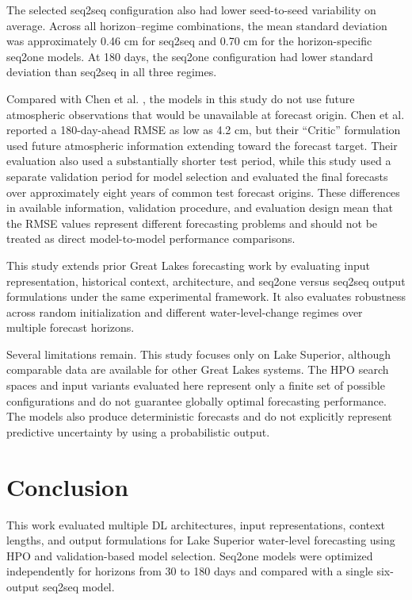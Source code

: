 \documentclass[conference]{IEEEtran}
\begin{document}
The selected seq2seq configuration also had lower seed-to-seed variability on average. Across all horizon--regime combinations, the mean standard deviation was approximately 0.46 cm for seq2seq and 0.70 cm for the horizon-specific seq2one models. At 180 days, the seq2one configuration had lower standard deviation than seq2seq in all three regimes.

Compared with Chen et al. \cite{chen2025dualtransformer}, the models in this study do not use future atmospheric observations that would be unavailable at forecast origin. Chen et al. reported a 180-day-ahead RMSE as low as 4.2 cm, but their ``Critic'' formulation used future atmospheric information extending toward the forecast target. Their evaluation also used a substantially shorter test period, while this study used a separate validation period for model selection and evaluated the final forecasts over approximately eight years of common test forecast origins. These differences in available information, validation procedure, and evaluation design mean that the RMSE values represent different forecasting problems and should not be treated as direct model-to-model performance comparisons.

This study extends prior Great Lakes forecasting work by evaluating input representation, historical context, architecture, and seq2one versus seq2seq output formulations under the same experimental framework. It also evaluates robustness across random initialization and different water-level-change regimes over multiple forecast horizons.

Several limitations remain. This study focuses only on Lake Superior, although comparable data are available for other Great Lakes systems. The HPO search spaces and input variants evaluated here represent only a finite set of possible configurations and do not guarantee globally optimal forecasting performance. The models also produce deterministic forecasts and do not explicitly represent predictive uncertainty by using a probabilistic output.


\section{Conclusion}

This work evaluated multiple DL architectures, input representations, context lengths, and output formulations for Lake Superior water-level forecasting using HPO and validation-based model selection. Seq2one models were optimized independently for horizons from 30 to 180 days and compared with a single six-output seq2seq model.
\end{document}
